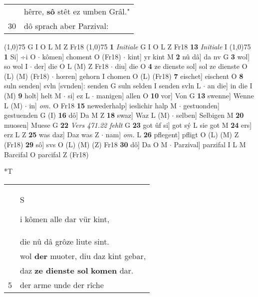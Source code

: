 \documentclass[8pt,a4paper,notitlepage]{article}
\begin{document}
\begin{table}[ht]
\begin{minipage}[t]{0.5\linewidth}
\begin{tabular}{rl}
 & hêrre, \textbf{sô} stêt ez umben Grâl."\\ 
30 & dô sprach aber Parzival:\\ 
\end{tabular}
\scriptsize
\line(1,0){75} \newline
G I O L M Z Fr18 \newline
\line(1,0){75} \newline
\textbf{1} \textit{Initiale} G I O L Z Fr18  \textbf{13} \textit{Initiale} I  \newline
\line(1,0){75} \newline
\textbf{1} Si] ÷i O  $\cdot$ kômen] choment O (Fr18)  $\cdot$ kint] yr kint M \textbf{2} nû dâ] da nv G \textbf{3} wol] so wol I  $\cdot$ der] die O L (M) Z Fr18  $\cdot$ diu] die O \textbf{4} ze dienste sol] sol ze dienste O (L) (M) (Fr18)  $\cdot$ hœren] gehorn I chomen O (L) (Fr18) \textbf{7} eischet] eischent O \textbf{8} suln senden] svln [svnden]: senden G suln selden I senden svln L  $\cdot$ an die] in die I (M) \textbf{9} holt] helt M  $\cdot$ si] ez L  $\cdot$ manigen] allen O \textbf{10} vor] Von G \textbf{13} swenne] Wenne L (M)  $\cdot$ in] \textit{om.} O Fr18 \textbf{15} newederhalp] ieslichir halp M  $\cdot$ gestuonden] gestuenden G (I) \textbf{16} dô] Da M Z \textbf{18} swaz] Waz L (M)  $\cdot$ selben] Selbigen M \textbf{20} muosen] Muese G \textbf{22} \textit{Vers 471.22 fehlt} G  \textbf{23} got ûf si] got sý L sie got M \textbf{24} ers] erz L Z \textbf{25} was daz] Daz was Z  $\cdot$ nam] \textit{om.} L \textbf{26} pflegent] pfligt O (L) (M) Z (Fr18) \textbf{29} sô] svs O (L) (M) (Z) Fr18 \textbf{30} dô] Da O M  $\cdot$ Parzival] parzifal I L M Barcifal O parcifal Z (Fr18) \newline
\end{minipage}
\hspace{0.5cm}
\begin{minipage}[t]{0.5\linewidth}
\small
\begin{center}*T
\end{center}
\begin{tabular}{rl}
 & \begin{large}S\end{large}i kômen alle dar vür kint,\\ 
 & die nû dâ grôze liute sint.\\ 
 & wol \textbf{der} muoter, diu daz kint gebar,\\ 
 & daz \textbf{ze dienste sol} \textbf{komen} dar.\\ 
5 & der arme unde der rîche\\ 

\end{tabular}
\end{minipage}
\end{table}
\end{document}
